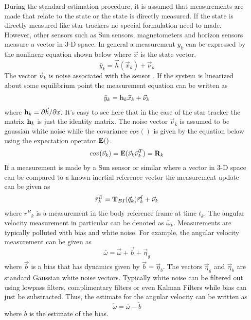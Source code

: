 \documentclass{article}
\begin{document}
During the standard estimation procedure, it is assumed that
measurements are made that relate to the state or the state is
directly measured. If the state is directly measured like star trackers no special formulation need to
made. However, other sensors such as Sun sensors, magnetometers and
horizon sensors measure a vector in 3-D space. In general a
measurement $\bar{y}_k$ can be expressed by the nonlinear equation
shown below where $\vec{x}$ is the state vector. 
\begin{equation}
  \bar{y}_k = \vec{h}(\vec{x}_k) + \vec{\nu}_k
\end{equation}
The vector $\vec{\nu}_k$ is noise associated with the sensor
\cite{Munoz,cassidis}. If the system is linearized about some
equilibrium point the measurement equation can be written as
\begin{equation}
  \bar{y}_k = {\bf h}_k\vec{x}_k + \vec{\nu}_k
\end{equation}
where ${\bf h}_k = \partial \vec{h}/\partial \vec{x}$. 
It's easy to see here that in the case of the star tracker the matrix
${\bf h}_k$ is just the identity matrix. The noise vector
$\vec{\nu}_k$ is assumed to be gaussian white noise while the
covariance $cov()$ is given by the equation below using the
expectation operator ${\bf E}()$.
\begin{equation}
  cov(\vec{\nu}_k) = {\bf E}(\vec{\nu}_k\vec{\nu}_k^T) = {\bf R}_k
\end{equation}
If a measurement is made by a
Sun sensor or similar where a vector in 3-D space can be compared to a
known inertial reference vector the measurement update can be given as 
\begin{equation}
  {\bar{r}^B}_k = {\bf T}_{BI}(\vec{q}_k){\vec{r}^I}_k + \vec{\nu}_k
\end{equation}
where ${\bar{r}^B}_k$ is a measurement in the body reference frame at
time $t_k$. The angular velocity measurement in particular can be denoted as
$\bar{\omega}_k$. Measurements are typically polluted with bias and
white noise. For example, the angular velocity measurement can be
given as
\begin{equation}
  \bar{\omega} = \vec{\omega} + \vec{b} + \vec{\eta}_g
\end{equation}
where $\vec{b}$ is a bias that has dynamics given by
$\dot{\vec{b}}=\vec{\eta}_b$. The vectors $\vec{\eta}_g$ and
$\vec{\eta}_b$ are standard Gaussian white noise vectors. Typically
white noise can be filtered out using lowpass filters, complimentary
filters or even Kalman Filters while bias can just be
substracted. Thus, the estimate for the angular velocity can be
written as
\begin{equation}
  \tilde{\omega} = \bar{\omega}-\tilde{b}
\end{equation}
where $\tilde{b}$ is the estimate of the bias.
\end{document}
